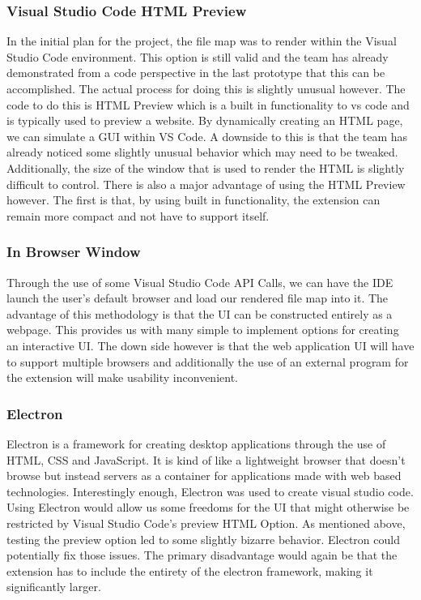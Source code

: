 \documentclass[letterpaper,10pt,titlepage,draftclsnofoot,onecolumn,onesided] {IEEEtran}
\begin{document}
\subsubsection{Visual Studio Code HTML Preview}
In the initial plan for the project, the file map was to render within the Visual Studio Code environment. 
This option is still valid and the team has already demonstrated from a code perspective in the last prototype that this can be accomplished. 
The actual process for doing this is slightly unusual however. 
The code to do this is HTML Preview which is a built in functionality to vs code and is typically used to preview a website. 
By dynamically creating an HTML page, we can simulate a GUI within VS Code. 
A downside to this is that the team has already noticed some slightly unusual behavior which may need to be tweaked. 
Additionally, the size of the window that is used to render the HTML is slightly difficult to control. 
There is also a major advantage of using the HTML Preview however. 
The first is that, by using built in functionality, the extension can remain more compact and not have to support itself.

\subsubsection{In Browser Window}
Through the use of some Visual Studio Code API Calls, we can have the IDE launch the user’s default browser and load our rendered file map into it.
The advantage of this methodology is that the UI can be constructed entirely as a webpage. 
This provides us with many simple to implement options for creating an interactive UI. 
The down side however is that the web application UI will have to support multiple browsers and additionally the use of an external program for the extension will make usability inconvenient. 

\subsubsection{Electron}
Electron is a framework for creating desktop applications through the use of HTML, CSS and JavaScript. 
It is kind of like a lightweight browser that doesn’t browse but instead servers as a container for applications made with web based technologies. 
Interestingly enough, Electron was used to create visual studio code. 
Using Electron would allow us some freedoms for the UI that might otherwise be restricted by Visual Studio Code’s preview HTML Option. 
As mentioned above, testing the preview option led to some slightly bizarre behavior. 
Electron could potentially fix those issues. 
The primary disadvantage would again be that the extension has to include the entirety of the electron framework, making it significantly larger.



\pagebreak


\end{document}
